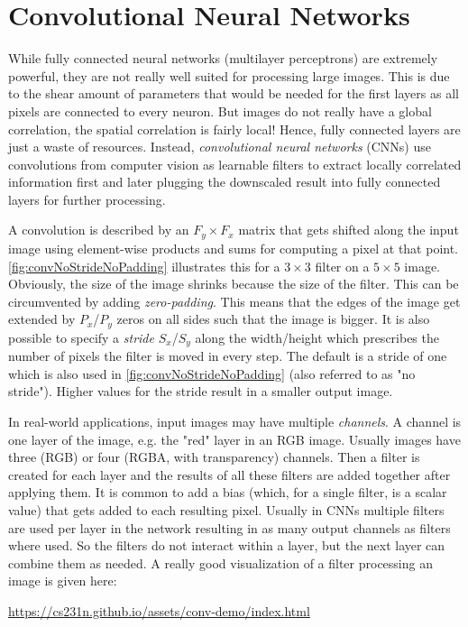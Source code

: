 \chapter{Convolutional Neural Networks}
	While fully connected neural networks (multilayer perceptrons) are extremely powerful, they are not really well suited for processing large images. This is due to the shear amount of parameters that would be needed for the first layers as all pixels are connected to every neuron. But images do not really have a global correlation, the spatial correlation is fairly local! Hence, fully connected layers are just a waste of resources. Instead, \emph{convolutional neural networks} (CNNs) use convolutions from computer vision as learnable filters to extract locally correlated information first and later plugging the downscaled result into fully connected layers for further processing.

	A convolution is described by an \( F_y \times F_x \) matrix that gets shifted along the input image using element-wise products and sums for computing a pixel at that point. \autoref{fig:convNoStrideNoPadding} illustrates this for a \(3 \times 3\) filter on a \(5 \times 5\) image. Obviously, the size of the image shrinks because the size of the filter. This can be circumvented by adding \emph{zero-padding}. This means that the edges of the image get extended by \( P_x \)/\( P_y \) zeros on all sides such that the image is bigger. It is also possible to specify a \emph{stride} \(S_x\)/\(S_y\) along the width/height which prescribes the number of pixels the filter is moved in every step. The default is a stride of one which is also used in \autoref{fig:convNoStrideNoPadding} (also referred to as "no stride"). Higher values for the stride result in a smaller output image.

	In real-world applications, input images may have multiple \emph{channels}. A channel is one layer of the image, e.g. the "red" layer in an RGB image. Usually images have three (RGB) or four (RGBA, with transparency) channels. Then a filter is created for each layer and the results of all these filters are added together after applying them. It is common to add a bias (which, for a single filter, is a scalar value) that gets added to each resulting pixel. Usually in CNNs multiple filters are used per layer in the network resulting in as many output channels as filters where used. So the filters do not interact within a layer, but the next layer can combine them as needed. A really good visualization of a filter processing an image is given here:
	\begin{center}
		\url{https://cs231n.github.io/assets/conv-demo/index.html}
	\end{center}

